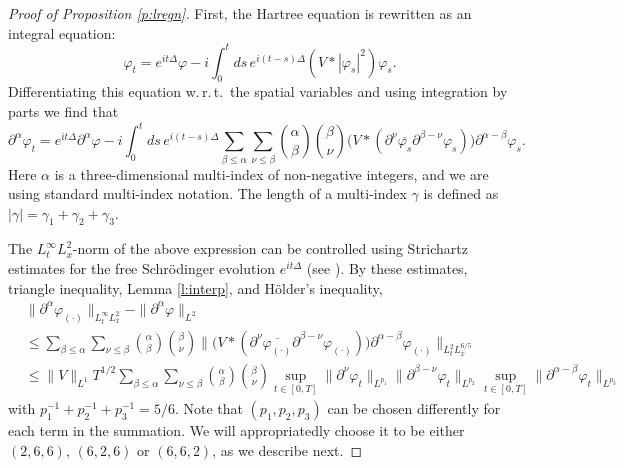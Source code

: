 \documentclass[11pt,a4paper,draft,DIV11]{scrartcl}	%
\begin{document}
\begin{proof}[Proof of Proposition \ref{p:lregn}]
  First, the Hartree equation is rewritten as an integral equation:
  \[
    \varphi_t = e^{it\Delta} \varphi - i \int_0^t ds \, e^{i(t-s)\Delta} (V *
    |\varphi_s|^2) \varphi_s.
  \]
  Differentiating this equation w.\,r.\,t.\ the spatial variables and using integration by parts we find that
  \[
    \partial^\alpha \varphi_t = e^{it \Delta} \partial^\alpha \varphi - i
    \int_0^t ds \, e^{i(t-s) \Delta} \sum_{\beta \le \alpha} \sum_{\nu \le
    \beta} \binom{\alpha}{\beta} \binom{\beta}{\nu} \big( V * (\partial^\nu
    \overline{\varphi_s} \partial^{\beta - \nu} \varphi_s) \big)
    \partial^{\alpha - \beta} \varphi_s.
  \]
  Here $\alpha$ is a three-dimensional multi-index of non-negative integers,
  and we are using standard multi-index notation. The length of a multi-index
  $\gamma$ is defined as $|\gamma| = \gamma_1 + \gamma_2 + \gamma_3$.


  The $L_t^\infty L_x^2$-norm of the above expression can be controlled using
  Strichartz estimates for the free Schr\"odinger evolution $e^{it\Delta}$
  (see \cite[Theorem 1.2]{KT}). By these estimates, triangle inequality, Lemma
  \ref{l:interp}, and H\"older's inequality,
  \begin{equation} \label{Dphi}
    \begin{split}
      & \| \partial^\alpha \varphi_{(\cdot)} \|_{L_t^\infty L_x^2} - \|
      \partial^\alpha \varphi \|_{L^2} \\
      & \le \sum_{\beta \le \alpha} \sum_{\nu \le \beta} \binom{\alpha}{\beta}
      \binom{\beta}{\nu} \| \big( V * (\partial^\nu
      \overline{\varphi_{(\cdot)}} \partial^{\beta - \nu} \varphi_{(\cdot)})
      \big) \partial^{\alpha - \beta} \varphi_{(\cdot)} \|_{L_t^2 L_x^{6/5}}
      \\
      & \le \| V \|_{L^1} T^{1/2} \sum_{\beta \le \alpha} \sum_{\nu \le \beta}
      \binom{\alpha}{\beta} \binom{\beta}{\nu} \sup_{t \in [0,T]} \|
      \partial^\nu \varphi_t \|_{L^{p_1}} \| \partial^{\beta - \nu} \varphi_t
      \|_{L^{p_2}} \sup_{t \in [0,T]} \| \partial^{\alpha - \beta} \varphi_t
      \|_{L^{p_3}}
    \end{split}
  \end{equation}
  with $p_1^{-1} + p_2^{-1} + p_3^{-1} = 5/6$. Note that $(p_1, p_2, p_3)$ can
  be chosen differently for each term in the summation. We will appropriatedly
  choose it to be either $(2,6,6)$, $(6,2,6)$ or $(6,6,2)$, as we describe
  next.



\end{proof}
\end{document}
